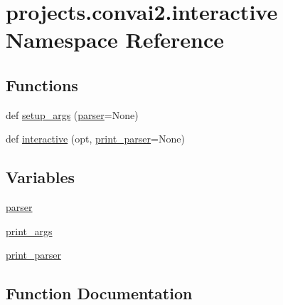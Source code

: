 \hypertarget{namespaceprojects_1_1convai2_1_1interactive}{}\section{projects.\+convai2.\+interactive Namespace Reference}
\label{namespaceprojects_1_1convai2_1_1interactive}
\subsection*{Functions}
\begin{DoxyCompactItemize}
\item 
def \hyperlink{namespaceprojects_1_1convai2_1_1interactive_ac1ba8d400d87a3bb10e40d5ab1bcfd86}{setup\+\_\+args} (\hyperlink{namespaceprojects_1_1convai2_1_1interactive_a357f3f81f9f343acbab6c962cb12495c}{parser}=None)
\item 
def \hyperlink{namespaceprojects_1_1convai2_1_1interactive_a81cb75ad91b081600739897e216e9302}{interactive} (opt, \hyperlink{namespaceprojects_1_1convai2_1_1interactive_a8683646bcf8a96c4e87b52d6a79f4a3a}{print\+\_\+parser}=None)
\end{DoxyCompactItemize}
\subsection*{Variables}
\begin{DoxyCompactItemize}
\item 
\hyperlink{namespaceprojects_1_1convai2_1_1interactive_a357f3f81f9f343acbab6c962cb12495c}{parser}
\item 
\hyperlink{namespaceprojects_1_1convai2_1_1interactive_a35edcce7766cfab1e9829722cdd82270}{print\+\_\+args}
\item 
\hyperlink{namespaceprojects_1_1convai2_1_1interactive_a8683646bcf8a96c4e87b52d6a79f4a3a}{print\+\_\+parser}
\end{DoxyCompactItemize}


\subsection{Function Documentation}
\mbox{\label{namespaceprojects_1_1convai2_1_1interactive_a81cb75ad91b081600739897e216e9302}} 
